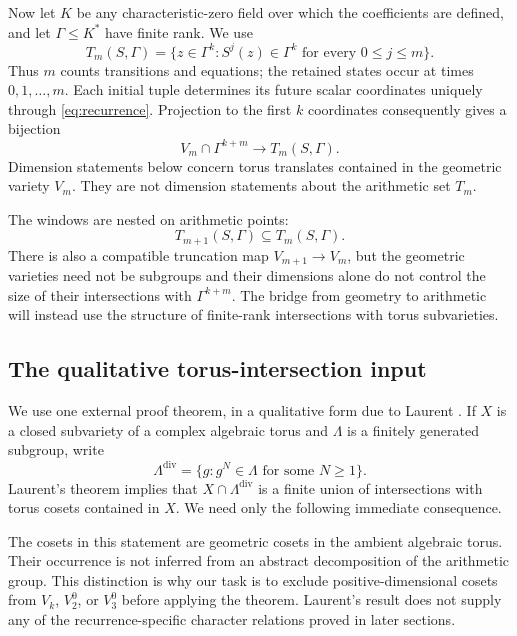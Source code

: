 \documentclass[11pt]{article}
\theoremstyle{definition}
\theoremstyle{remark}
\newcommand{\Gam}{\Gamma}
\newcommand{\divh}{\mathrm{div}}
\begin{document}
Now let $K$ be any characteristic-zero field over which the coefficients are defined, and let $\Gam\leq K^*$ have finite rank.  We use
\begin{equation}
T_m(S,\Gam)=\{z\in\Gam^k:S^j(z)\in\Gam^k
 \text{ for every }0\leq j\leq m\}.
\label{eq:Tm}
\end{equation}
Thus $m$ counts transitions and equations; the retained states occur at times $0,1,\ldots,m$.  Each initial tuple determines its future scalar coordinates uniquely through \eqref{eq:recurrence}.  Projection to the first $k$ coordinates consequently gives a bijection
\begin{equation}
V_m\cap\Gam^{k+m}\longrightarrow T_m(S,\Gam).
\label{eq:projection}
\end{equation}
Dimension statements below concern torus translates contained in the geometric variety $V_m$.  They are not dimension statements about the arithmetic set $T_m$.

The windows are nested on arithmetic points:
\[
T_{m+1}(S,\Gam)\subseteq T_m(S,\Gam).
\]
There is also a compatible truncation map $V_{m+1}\to V_m$, but the
geometric varieties need not be subgroups and their dimensions alone do not
control the size of their intersections with $\Gam^{k+m}$.  The bridge from
geometry to arithmetic will instead use the structure of finite-rank
intersections with torus subvarieties.

\subsection{The qualitative torus-intersection input}

We use one external proof theorem, in a qualitative form due to Laurent \cite{Laurent1984}.  If $X$ is a closed subvariety of a complex algebraic torus and $\Lambda$ is a finitely generated subgroup, write
\[
\Lambda^{\divh}=\{g:g^N\in\Lambda\text{ for some }N\geq1\}.
\]
Laurent's theorem implies that $X\cap\Lambda^{\divh}$ is a finite union of intersections with torus cosets contained in $X$.  We need only the following immediate consequence.

The cosets in this statement are geometric cosets in the ambient algebraic
torus.  Their occurrence is not inferred from an abstract decomposition of
the arithmetic group.  This distinction is why our task is to exclude
positive-dimensional cosets from $V_k$, $V_2^0$, or $V_3^0$ before applying
the theorem.  Laurent's result does not supply any of the recurrence-specific
character relations proved in later sections.
\end{document}
